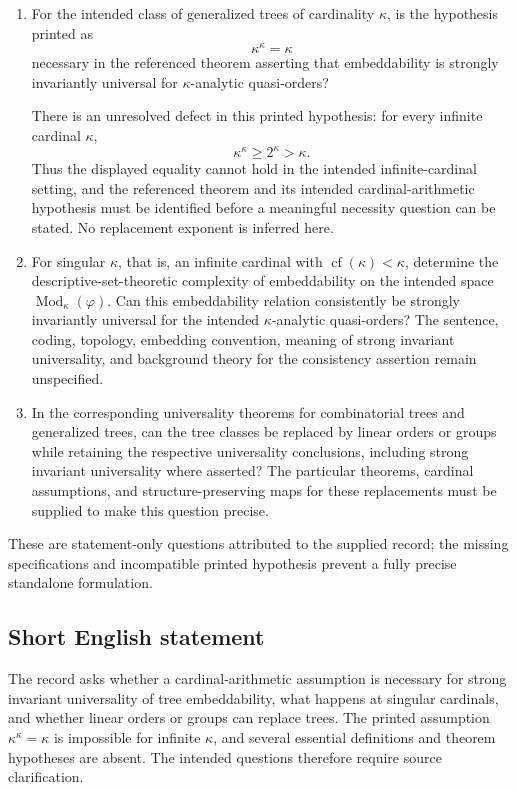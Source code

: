 \documentclass[11pt]{article}
\begin{document}
\begin{enumerate}
\item For the intended class of generalized trees of cardinality \(\kappa\), is the hypothesis printed as
\[
\kappa^{\kappa}=\kappa
\]
necessary in the referenced theorem asserting that embeddability is strongly invariantly universal for \(\kappa\)-analytic quasi-orders?

There is an unresolved defect in this printed hypothesis: for every infinite cardinal \(\kappa\),
\[
\kappa^{\kappa}\geq 2^{\kappa}>\kappa.
\]
Thus the displayed equality cannot hold in the intended infinite-cardinal setting, and the referenced theorem and its intended cardinal-arithmetic hypothesis must be identified before a meaningful necessity question can be stated. No replacement exponent is inferred here.

\item For singular \(\kappa\), that is, an infinite cardinal with \(\operatorname{cf}(\kappa)<\kappa\), determine the descriptive-set-theoretic complexity of embeddability on the intended space \(\operatorname{Mod}_{\kappa}(\varphi)\). Can this embeddability relation consistently be strongly invariantly universal for the intended \(\kappa\)-analytic quasi-orders? The sentence, coding, topology, embedding convention, meaning of strong invariant universality, and background theory for the consistency assertion remain unspecified.

\item In the corresponding universality theorems for combinatorial trees and generalized trees, can the tree classes be replaced by linear orders or groups while retaining the respective universality conclusions, including strong invariant universality where asserted? The particular theorems, cardinal assumptions, and structure-preserving maps for these replacements must be supplied to make this question precise.
\end{enumerate}

These are statement-only questions attributed to the supplied record; the missing specifications and incompatible printed hypothesis prevent a fully precise standalone formulation.
\subsection{Short English statement}
The record asks whether a cardinal-arithmetic assumption is necessary for strong invariant universality of tree embeddability, what happens at singular cardinals, and whether linear orders or groups can replace trees. The printed assumption \(\kappa^{\kappa}=\kappa\) is impossible for infinite \(\kappa\), and several essential definitions and theorem hypotheses are absent. The intended questions therefore require source clarification.
\end{document}
